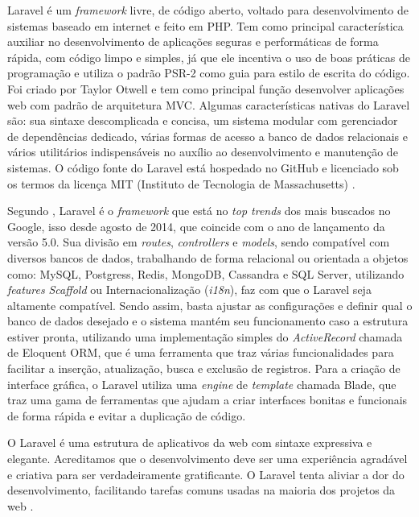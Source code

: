 Laravel é um \textit{framework} livre, de código aberto, voltado para desenvolvimento de sistemas baseado em internet e feito em PHP. Tem como principal característica auxiliar no desenvolvimento de aplicações seguras e performáticas de forma rápida, com código limpo e simples, já que ele incentiva o uso de boas práticas de programação e utiliza o padrão PSR-2 como guia para estilo de escrita do código. Foi criado por Taylor Otwell e tem como principal função desenvolver aplicações web com padrão de arquitetura MVC. Algumas características nativas do Laravel são: sua sintaxe descomplicada e concisa, um sistema modular com gerenciador de dependências dedicado, várias formas de acesso a banco de dados relacionais e vários utilitários indispensáveis no auxílio ao desenvolvimento e manutenção de sistemas. O código fonte do Laravel está hospedado no GitHub e licenciado sob os termos da licença MIT (Instituto de Tecnologia de Massachusetts) \cite{portalgsti:laravel}. 

Segundo , Laravel é o \textit{framework} que está no \textit{top trends} dos mais buscados no Google, isso desde agosto de 2014, que coincide com o ano de lançamento da versão 5.0. Sua divisão em \textit{routes}, \textit{controllers} e \textit{models}, sendo compatível com diversos bancos de dados, trabalhando de forma relacional ou orientada a objetos como: MySQL, Postgress, Redis, MongoDB, Cassandra e SQL Server, utilizando \textit{features} \textit{Scaffold} ou Internacionalização (\textit{i18n}), faz com que o Laravel seja altamente compatível. Sendo assim, basta ajustar as configurações e definir qual o banco de dados desejado e o sistema mantém seu funcionamento caso a estrutura estiver pronta, utilizando uma implementação simples do \textit{ActiveRecord} chamada de Eloquent ORM, que é uma ferramenta que traz várias funcionalidades para facilitar a inserção, atualização, busca e exclusão de registros. Para a criação de interface gráfica, o Laravel utiliza uma \textit{engine} de \textit{template} chamada Blade, que traz uma gama de ferramentas que ajudam a criar interfaces bonitas e funcionais de forma rápida e evitar a duplicação de código.

\begin{citacao}
 O Laravel é uma estrutura de aplicativos da web com sintaxe expressiva e elegante. Acreditamos que o desenvolvimento deve ser uma experiência agradável e criativa para ser verdadeiramente gratificante. O Laravel tenta aliviar a dor do desenvolvimento, facilitando tarefas comuns usadas na maioria dos projetos da web \cite{laravel}.
\end{citacao}

